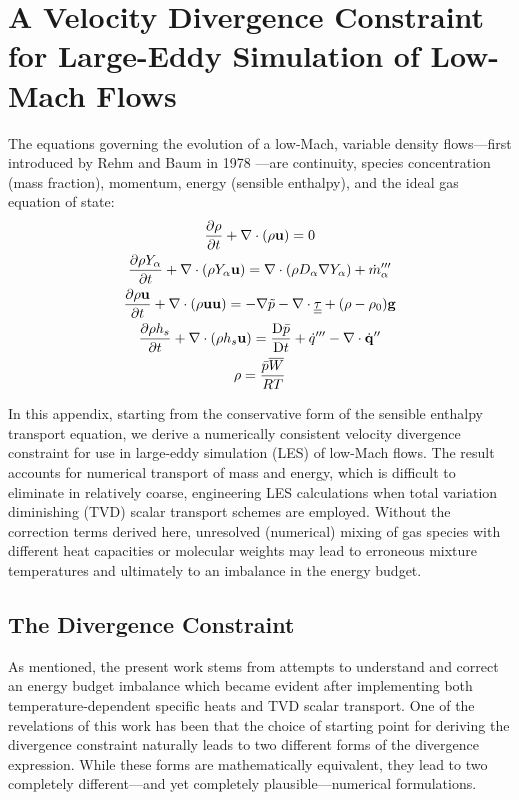 \chapter{A Velocity Divergence Constraint for Large-Eddy Simulation of Low-Mach Flows}
\label{app_divergence}

The equations governing the evolution of a low-Mach, variable density flows---first introduced by Rehm and Baum in 1978 \cite{Rehm:1}---are continuity, species concentration (mass fraction), momentum, energy (sensible enthalpy), and the ideal gas equation of state:
\begin{gather}
\label{eqn_rho} \frac{\partial \rho}{\partial t} + \nabla\cdot(\rho\mathbf{u}) = 0 \\
\label{eqn_Y_a} \frac{\partial \rho Y_\alpha}{\partial t} + \nabla\cdot(\rho Y_\alpha \mathbf{u}) = \nabla\cdot (\rho D_\alpha \nabla Y_\alpha) + \dot{m}_\alpha^{\prime\prime\prime} \\
\label{eqn_u}   \frac{\partial \rho \mathbf{u}}{\partial t} + \nabla\cdot(\rho \mathbf{u} \mathbf{u}) = -\nabla \tilde{p} - \nabla\cdot\underline{\underline{\tau}} + (\rho-\rho_0) \mathbf{g} \\
\label{eqn_h_s} \frac{\partial \rho h_s}{\partial t} + \nabla\cdot(\rho h_s \mathbf{u}) = \frac{\mbox{D} \bar{p}}{\mbox{D} t} + \dot{q}^{\prime\prime\prime} - \nabla\cdot \dot{\mathbf{q}}^{\prime\prime} \\
\label{eqn_eos} \rho = \frac{\bar{p} \overline{W}}{RT}
\end{gather}

In this appendix, starting from the conservative form of the sensible enthalpy transport equation, we derive a numerically consistent velocity divergence constraint for use in large-eddy simulation (LES) of low-Mach flows.  The result accounts for numerical transport of mass and energy, which is difficult to eliminate in relatively coarse, engineering LES calculations when total variation diminishing (TVD) scalar transport schemes are employed.  Without the correction terms derived here, unresolved (numerical) mixing of gas species with different heat capacities or molecular weights may lead to erroneous mixture temperatures and ultimately to an imbalance in the energy budget.

\section{The Divergence Constraint}
\label{div_constraint}

As mentioned, the present work stems from attempts to understand and correct an energy budget imbalance which became evident after implementing both temperature-dependent specific heats and TVD scalar transport. One of the revelations of this work has been that the choice of starting point for deriving the divergence constraint naturally leads to two different forms of the divergence expression.  While these forms are mathematically equivalent, they lead to two completely different---and yet completely plausible---numerical formulations.

